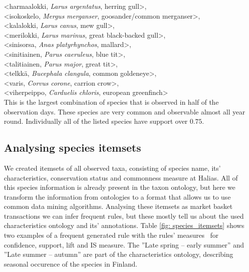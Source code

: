 \documentclass[english]{tktltiki2}
\begin{document}
\hangindent=0.7cm
<harmaalokki, \emph{Larus argentatus}, herring gull>, \\
<isokoskelo, \emph{Mergus merganser}, goosander/common merganser>, \\
<kalalokki, \emph{Larus canus}, mew gull>, \\
<merilokki, \emph{Larus marinus}, great black-backed gull>, \\
<sinisorsa, \emph{Anas platyrhynchos}, mallard>, \\
<sinitiainen, \emph{Parus caeruleus}, blue tit>, \\
<talitiainen, \emph{Parus major}, great tit>, \\
<telkkä, \emph{Bucephala clangula}, common goldeneye>, \\
<varis, \emph{Corvus corone}, carrion crow>, \\
<viherpeippo, \emph{Carduelis chloris}, european greenfinch> \\

This is the largest combination of species that is observed in half of the observation days. These species are very common and observable almost all year round. Individually all of the listed species have support over $0.75$.






\subsection{Analysing species itemsets}

We created itemsets of all observed taxa, consisting of species name, its' characteristics, conservation status and commonness measure at Halias. All of this species information is already present in the taxon ontology, but here we transform the information from ontologies to a format that allows us to use common data mining algorithms. Analysing these itemsets as market basket transactions we can infer frequent rules, but these mostly tell us about the used characteristics ontology and its' annotations.
Table \ref{fig: species_itemsets} shows two examples of a frequent generated rule with the rules' measures~\cite{tan2006introduction} for confidence, support, lift and IS measure.
The ''Late spring -- early summer'' and ''Late summer -- autumn'' are part of the characteristics ontology, describing seasonal occurence of the species in Finland.
\end{document}
